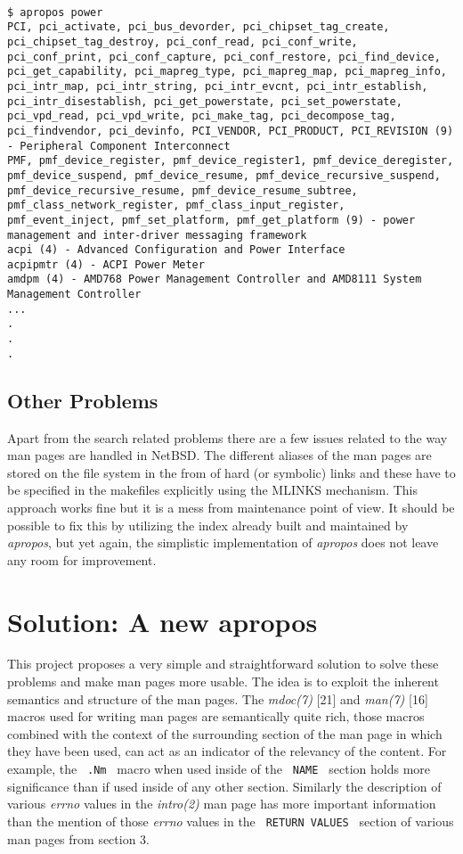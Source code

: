 \documentclass[letterpaper,twocolumn,10pt]{article}
\begin{document}
{\tt \small
{}
\begin{lstlisting}
$ apropos power
PCI, pci_activate, pci_bus_devorder, pci_chipset_tag_create,
pci_chipset_tag_destroy, pci_conf_read, pci_conf_write,
pci_conf_print, pci_conf_capture, pci_conf_restore, pci_find_device,
pci_get_capability, pci_mapreg_type, pci_mapreg_map, pci_mapreg_info,
pci_intr_map, pci_intr_string, pci_intr_evcnt, pci_intr_establish,
pci_intr_disestablish, pci_get_powerstate, pci_set_powerstate,
pci_vpd_read, pci_vpd_write, pci_make_tag, pci_decompose_tag,
pci_findvendor, pci_devinfo, PCI_VENDOR, PCI_PRODUCT, PCI_REVISION (9)
- Peripheral Component Interconnect
PMF, pmf_device_register, pmf_device_register1, pmf_device_deregister,
pmf_device_suspend, pmf_device_resume, pmf_device_recursive_suspend,
pmf_device_recursive_resume, pmf_device_resume_subtree,
pmf_class_network_register, pmf_class_input_register,
pmf_event_inject, pmf_set_platform, pmf_get_platform (9) - power
management and inter-driver messaging framework
acpi (4) - Advanced Configuration and Power Interface
acpipmtr (4) - ACPI Power Meter
amdpm (4) - AMD768 Power Management Controller and AMD8111 System
Management Controller
...
.
.
.
\end{lstlisting}
}

\subsection{Other Problems}
Apart from the search related problems there are a few issues related to
the way man pages are handled in NetBSD. The different aliases of the man pages
are stored on the file system in the from of hard (or symbolic) links and these
have to be specified in the makefiles explicitly using the MLINKS mechanism. This
approach works fine but it is a mess from maintenance point of view.
It should be possible to fix this by utilizing the index already built and
maintained by \textit{apropos}, but yet again, the simplistic implementation of
\textit{apropos} does not leave any room for improvement.

\section{Solution: A new apropos}
This project proposes a very simple and straightforward solution to solve these
problems and make man pages more usable. The idea is to exploit the inherent
semantics and structure of the man pages. The \textit{mdoc(7)} [21] and
\textit{man(7)} [16] macros used for writing man pages are semantically quite
rich, those macros combined with the context of the surrounding section of the
man page in which they have been used, can act
as an indicator of the relevancy of the content. For example, the
{\tt \small
.Nm
}
macro when used inside of the
{\tt \small
NAME
}
section holds more significance than if used inside of any other section. Similarly the description of various \textit{errno} values in the
\textit{intro(2)} man page has more important information than the mention of
those \textit{errno} values in the
{\tt \small
RETURN VALUES
}
section of various man pages from section 3. \\
\end{document}
